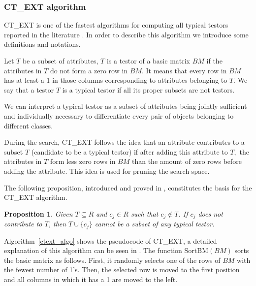 \documentclass[authoryear,11pt]{elsarticle}
\newtheorem{proposition}{Proposition}
\begin{document}
\subsubsection{CT\_EXT algorithm}
	CT\_EXT is one of the fastest algorithms for computing all typical testors reported in the 
	literature \citep{Sanchez07,Sanchez10,Piza14}. In order to describe this algorithm we 
	introduce some definitions and notations.	
	
	Let $T$ be a subset of attributes, $T$ is a testor of a basic matrix $BM$ if the attributes in $T$ do 
	not form a zero row 	in $BM$. It means that every row in $BM$ has at least a 1 in those columns corresponding 
	to attributes belonging to $T$. We say that a testor $T$ is a typical testor if all its proper subsets 
	are not	testors.
	
	We can interpret a typical testor as a subset of attributes being jointly sufficient and individually
	necessary to differentiate every pair of objects belonging to different classes.
	
	During the search, CT\_EXT follows the idea that an attribute contributes to a subset $T$ (candidate to 
	be a typical testor) if after adding this attribute to $T,$ the attributes in $T$ form less zero rows 
	in $BM$ than the amount of zero rows before adding the attribute. This idea is used for pruning the search
	space.
	
	The following proposition, introduced and proved in \citep{Sanchez07}, constitutes the basis for the CT\_EXT
	algorithm.
	
	\begin{proposition}\label{prop1} 
	Given $T \subseteq R$ and $c_j \in R$ such that $c_j \notin T$. If $c_j$ 
	does not contribute to $T$, then $T\cup\{c_j\}$ cannot be a subset of any typical testor.
	\end{proposition}
	
	Algorithm~\ref{ctext_algo} shows the pseudocode of CT\_EXT, a detailed explanation of
	this algorithm can be seen in \citep{Sanchez07}. The function SortBM$(BM)$ sorts the basic matrix as follows.
	First, it randomly selects one of the rows of $BM$ with the fewest number of 1's. Then, the selected row is
	moved to the first position and all columns in which it has a 1 are moved to the left.
	
\end{document}
